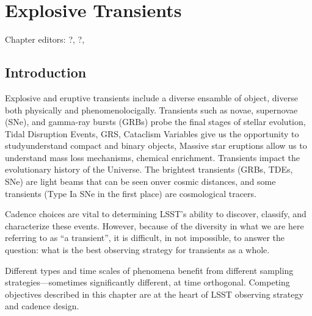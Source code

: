 
\chapter[Eruptive and Explosive Transients]{Explosive Transients}
\def\chpname{transients}\label{chp:\chpname}


Chapter editors:
?,
?,



\section{Introduction}


Explosive and eruptive transients include a diverse ensamble of object, diverse both physically and phenomenolocigally. Transients such as novae, supernovae (SNe), and gamma-ray bursts (GRBs) probe the final stages of stellar evolution, Tidal Disruption Events, GRS, Cataclism Variables give us the opportunity to studyunderstand compact and binary objects, Massive star eruptions allow us to understand mass loss mechanisms, chemical enrichment. Transients impact the evolutionary history of the Universe. The brightest transients (GRBs, TDEs, SNe) are light beams that can be seen onver cosmic distances, and some transients (Type Ia SNe in the first place) are cosmological tracers.

Cadence choices are vital to determining LSST's ability to discover, classify, and characterize these events. However, because of the diversity in what we are here referring to as ``a transient'', it is difficult, in not impossible, to answer the question: what is the best observing strategy for transients as a whole. 

Different types and time scales of phenomena benefit from different sampling strategies---sometimes significantly different, at time orthogonal.  Competing objectives described in this chapter are at the heart of LSST observing strategy and cadence design.


